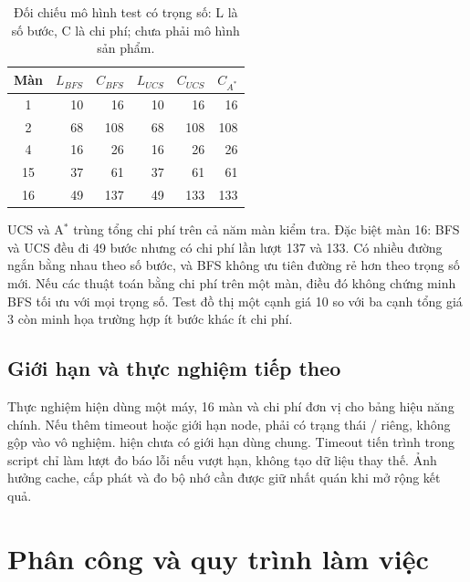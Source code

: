 \documentclass[a4paper]{article}
\newcommand{\tep}[1]{{\small\ttfamily\detokenize{#1}}}
\newcommand{\astar}{\texorpdfstring{A\ensuremath{^*}}{A*}}
\begin{document}
\begin{table}[H]\centering\small
\renewcommand{\arraystretch}{1.12}
\begin{tabular}{@{}crrrrr@{}}\toprule
\textbf{Màn} & \textbf{$L_{BFS}$} & \textbf{$C_{BFS}$} & \textbf{$L_{UCS}$} & \textbf{$C_{UCS}$} & \textbf{$C_{A^*}$}\\\midrule
1 & 10 & 16 & 10 & 16 & 16\\
2 & 68 & 108 & 68 & 108 & 108\\
4 & 16 & 26 & 16 & 26 & 26\\
15 & 37 & 61 & 37 & 61 & 61\\
16 & 49 & 137 & 49 & 133 & 133\\
\bottomrule\end{tabular}
\caption[Đối chiếu mô hình test có trọng số]{Đối chiếu mô hình test có trọng số: L là số bước, C là chi phí; chưa phải mô hình sản phẩm.}
\end{table}

UCS và \astar{} trùng tổng chi phí trên cả năm màn kiểm tra. Đặc biệt màn 16: BFS và UCS đều đi 49 bước nhưng có chi phí lần lượt 137 và 133. Có nhiều đường ngắn bằng nhau theo số bước, và BFS không ưu tiên đường rẻ hơn theo trọng số mới. Nếu các thuật toán bằng chi phí trên một màn, điều đó không chứng minh BFS tối ưu với mọi trọng số. Test đồ thị một cạnh giá 10 so với ba cạnh tổng giá 3 còn minh họa trường hợp ít bước khác ít chi phí. 

\subsection{Giới hạn và thực nghiệm tiếp theo}
Thực nghiệm hiện dùng một máy, 16 màn và chi phí đơn vị cho bảng hiệu năng chính. 
Nếu thêm timeout hoặc giới hạn node, phải có trạng thái \tep{timeout}/\tep{limit} riêng, không gộp vào vô nghiệm. \tep{BaseSolver} hiện chưa có giới hạn dùng chung. Timeout tiến trình trong script chỉ làm lượt đo báo lỗi nếu vượt hạn, không tạo dữ liệu thay thế. Ảnh hưởng cache, cấp phát và đo bộ nhớ cần được giữ nhất quán khi mở rộng kết quả.

\section{Phân công và quy trình làm việc}
\end{document}
